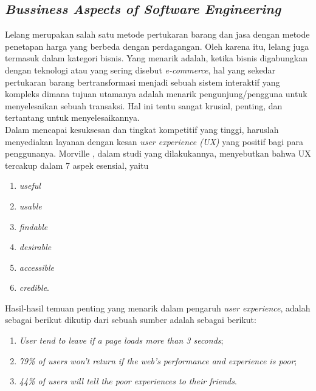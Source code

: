 \subsection{\textit{Bussiness Aspects of Software Engineering}}
	
	Lelang merupakan salah satu metode pertukaran barang dan jasa dengan metode penetapan harga yang berbeda dengan perdagangan. Oleh karena itu, lelang juga termasuk dalam kategori bisnis. Yang menarik adalah, ketika bisnis digabungkan dengan teknologi atau yang sering disebut \textit{e-commerce}, hal yang sekedar pertukaran barang bertransformasi menjadi sebuah sistem interaktif yang kompleks dimana tujuan utamanya adalah menarik pengunjung/pengguna untuk menyelesaikan sebuah transaksi. Hal ini tentu sangat krusial, penting, dan tertantang untuk menyelesaikannya. \\
	\indent Dalam mencapai kesuksesan dan tingkat kompetitif yang tinggi, haruslah menyediakan layanan dengan kesan \textit{user experience (UX)} yang positif bagi para penggunanya. Morville  \cite[p.~27]{a-set-of-heuristics-2014} , dalam studi yang dilakukannya, menyebutkan bahwa UX tercakup dalam 7 aspek esensial, yaitu \begin{enumerate}[label=\alph*.]
		\item \textit{useful}
		\item \textit{usable}
		\item \textit{findable}
		\item \textit{desirable}
		\item \textit{accessible}
		\item \textit{credible}.
		\end{enumerate}
	
	\indent Hasil-hasil temuan penting yang menarik dalam pengaruh \textit{user experience}, adalah sebagai berikut dikutip dari sebuah sumber adalah sebagai berikut:
	\begin{enumerate}[label=\alph*.]
		\item \textit{User tend to leave if a page loads more than 3 seconds};
		\item \textit{79\% of users won't return if the web's performance and experience is poor};
		\item \textit{44\% of users will tell the poor experiences to their friends}.
	\end{enumerate}
	
